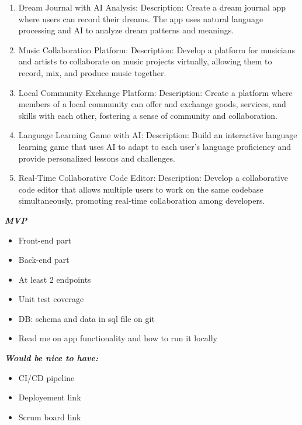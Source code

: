 \documentclass[a4paper,12pt]{article}
\begin{document}
\begin{large}
\begin{enumerate}
\item Dream Journal with AI Analysis: Description: Create a dream journal app where users can record their dreams. The app uses natural language processing and AI to analyze dream patterns and meanings.

\item Music Collaboration Platform: Description: Develop a platform for musicians and artists to collaborate on music projects virtually, allowing them to record, mix, and produce music together.

\item Local Community Exchange Platform: Description: Create a platform where members of a local community can offer and exchange goods, services, and skills with each other, fostering a sense of community and collaboration.

\item Language Learning Game with AI: Description: Build an interactive language learning game that uses AI to adapt to each user's language proficiency and provide personalized lessons and challenges.

\item Real-Time Collaborative Code Editor: Description: Develop a collaborative code editor that allows multiple users to work on the same codebase simultaneously, promoting real-time collaboration among developers.

\end{enumerate}


\textit{\textbf{MVP}}

\begin{itemize}
\item Front-end part

\item Back-end part

\item At least 2 endpoints

\item Unit test coverage

\item DB: schema and data in sql file on git

\item Read me on app functionality and how to run it locally

\end{itemize}



\textit{\textbf{Would be nice to have:}}

\begin{itemize}
\item CI/CD pipeline

\item Deployement link

\item Scrum board link

\end{itemize}

\end{large}
\end{document}
